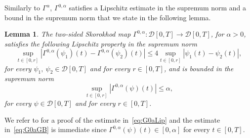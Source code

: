 \documentclass[11pt]{amsart}
\newtheorem{lemma}[theorem]{Lemma}
\begin{document}
{Similarly to $\Gamma^{\alpha}$, $\Gamma^{0,\alpha}$ satisfies a Lipschitz estimate in the supremum norm and a bound in the supremum norm that we state in the following lemma.
\begin{lemma}\label{lem:G0aProp}
The two-sided Skorokhod map $\Gamma^{0,\alpha}: \mathcal{D}[0,T] \to \mathcal{D}[0,T]$, for $\alpha>0$, satisfies the following Lipschitz property in the supremum norm
\begin{equation}\label{eq:G0aLip}
\sup_{t \in [0,r]} |\Gamma^{0,\alpha}(\psi_{1})(t)-\Gamma^{0,\alpha}(\psi_{2})(t)| \leq 4 \sup_{t \in [0,r]} |\psi_{1}(t)-\psi_{2}(t)|,
\end{equation}
for every $\psi_{1},\ \psi_{2} \in \mathcal{D}[0,T]$ and for every $r \in [0,T]$, and is bounded in the supremum norm
\begin{equation}\label{eq:G0aGB}
\sup_{t \in [0,r]} |\Gamma^{0,\alpha}(\psi)(t)| \leq \alpha,
\end{equation}
for every $\psi \in \mathcal{D}[0,T]$ and for every $r \in [0,T]$.
\end{lemma}
We refer to \cite{MR2349573} for a proof of the estimate in~\eqref{eq:G0aLip} and the estimate in~\eqref{eq:G0aGB} is immediate since $\Gamma^{0,\alpha}(\psi)(t) \in [0,\alpha]$ for every $t \in [0,T]$.

}
\end{document}
